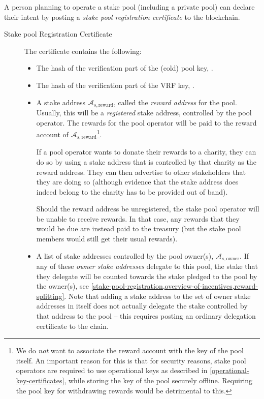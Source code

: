 \documentclass[11pt,a4paper,dvipsnames,twosided]{article}
\begin{document}
A person planning to operate a stake pool (including a private pool) can
declare their intent by posting a \emph{stake pool registration certificate} to
the blockchain.

\begin{description}
\item[Stake pool Registration Certificate]
The certificate contains the following:

\begin{itemize}
\item
  The hash of the verification part of the (cold) pool key, .

\item
  The hash of the verification part of the VRF key, .

\item
  A stake address \(\mathcal{A}_{s,\text{reward}}\), called the \emph{reward
    address} for the pool. Usually, this will be a \emph{registered} stake
  address, controlled by the pool operator. The rewards for the pool operator
  will be paid to the reward account of
  \(\mathcal{A}_{s,\text{reward}}\)\footnote{We do \emph{not} want to associate
    the reward account with the key of the pool itself. An important reason for
    this is that for security reasons, stake pool operators are required to use
    operational keys as described in \cref{operational-key-certificates}, while
    storing the key of the pool securely offline. Requiring the pool key for
    withdrawing rewards would be detrimental to this.}.

  If a pool operator wants to donate their rewards to a charity, they can do so
  by using a stake address that is controlled by that charity as the reward
  address. They can then advertise to other stakeholders that they are doing so
  (although evidence that the stake address does indeed belong to the charity
  has to be provided out of band).

  Should the reward address be unregistered, the stake pool operator will be
  unable to receive rewards. In that case, any rewards that they would be due
  are instead paid to the treasury (but the stake pool members would still get
  their usual rewards).

\item
  A list of stake addresses controlled by the pool owner(s),
  \(\mathcal{A}_{s,\text{owner}}\). If any of these \emph{owner stake addresses}
  delegate to this pool, the stake that they delegate will be counted towards
  the stake pledged to the pool by the owner(s), see
  \cref{stake-pool-registration,overview-of-incentives,reward-splitting}. Note
  that adding a stake address to the set of owner stake addresses in itself does
  not actually delegate the stake controlled by that address to the pool -- this
  requires posting an ordinary delegation certificate to the chain.


\end{itemize}
\end{description}
\end{document}
